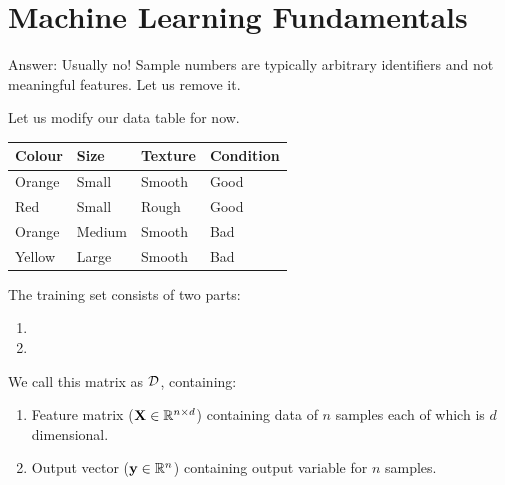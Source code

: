 \documentclass[usenames,dvipsnames]{beamer}
\begin{document}
\section{Machine Learning Fundamentals}

  
\begin{frame}Answer: Usually no! Sample numbers are typically arbitrary identifiers and not meaningful features. Let us remove it.

\pause Let us modify our data table for now.

\begin{table}[]
	\begin{tabular}{|l|l|l||l|}
		\hline 
		\textbf{Colour} & \textbf{Size} & \textbf{Texture} & \textbf{Condition} \\ \hline 
		Orange & Small & Smooth  & Good      \\
		Red    & Small  & Rough  & Good \\
		Orange & Medium & Smooth & Bad \\
		Yellow & Large  & Smooth & Bad \\ \hline 

	\end{tabular}
\end{table}
\end{frame}

\begin{frame}The training set consists of two parts:
\begin{enumerate}
	\item \pause \color{Lavender}{Features (Input Variables)}
	\item \pause \color{Tan}{Output or Response Variable}
\end{enumerate}
\end{frame}

\begin{frame}We call this matrix as $\mathcal{D}$, containing:
\begin{enumerate}
	\item Feature matrix ($\mathbf{X} \in \mathbb{R}^{n \times d}$) containing data of $n$ samples each of which is $d$ dimensional.
	\item Output vector ($\mathbf{y} \in \mathbb{R}^n$) containing output variable for $n$ samples.
\end{enumerate}

\end{frame}
\end{document}
